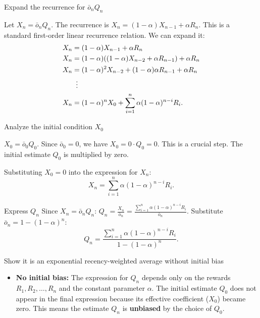 {{\large Expand the recurrence for $\bar{o}_n Q_n$}

Let $X_n = \bar{o}_n Q_n$. The recurrence is $X_n = (1-\alpha)X_{n-1} + \alpha R_n$.
This is a standard first-order linear recurrence relation. We can expand it:
\begin{align*}
X_n &= (1-\alpha)X_{n-1} + \alpha R_n \\
X_n &= (1-\alpha)((1-\alpha)X_{n-2} + \alpha R_{n-1}) + \alpha R_n \\
X_n &= (1-\alpha)^2 X_{n-2} + (1-\alpha)\alpha R_{n-1} + \alpha R_n \\
&\vdotswithin{=} \\
X_n &= (1-\alpha)^n X_0 + \sum_{i=1}^n \alpha (1-\alpha)^{n-i} R_i.
\end{align*}

{\large Analyze the initial condition $X_0$}

$X_0 = \bar{o}_0 Q_0$. Since $\bar{o}_0 = 0$, we have $X_0 = 0 \cdot Q_0 = 0$.
This is a crucial step. The initial estimate $Q_0$ is multiplied by zero.

Substituting $X_0 = 0$ into the expression for $X_n$:
\begin{equation}
X_n = \sum_{i=1}^n \alpha (1-\alpha)^{n-i} R_i.
\end{equation}

{\large Express $Q_n$}
Since $X_n = \bar{o}_n Q_n$:
$Q_n = \frac{X_n}{\bar{o}_n} = \frac{\sum_{i=1}^n \alpha (1-\alpha)^{n-i} R_i}{\bar{o}_n}$.
Substitute $\bar{o}_n = 1-(1-\alpha)^n$:
\begin{equation}
Q_n = \frac{\sum_{i=1}^n \alpha (1-\alpha)^{n-i} R_i}{1-(1-\alpha)^n}.
\end{equation}

{\large Show it is an exponential recency-weighted average without initial bias}

\begin{itemize}
    \item \textbf{No initial bias:} The expression for $Q_n$ depends only on the rewards $R_1, R_2, \dots, R_n$ and the constant parameter $\alpha$. The initial estimate $Q_0$ does not appear in the final expression because its effective coefficient ($X_0$) became zero. This means the estimate $Q_n$ is \textbf{unbiased} by the choice of $Q_0$.


\end{itemize}}
